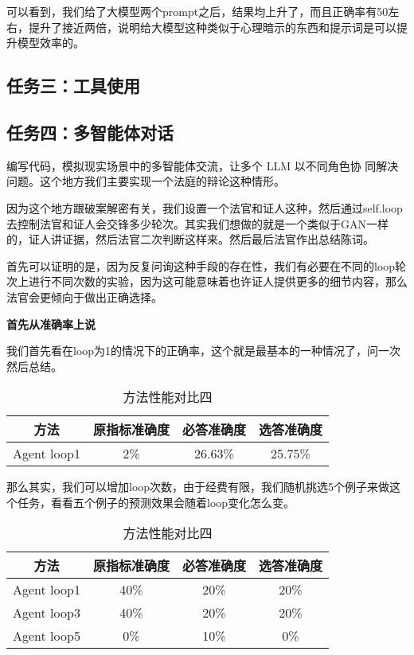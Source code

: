 \documentclass[answers]{exam}  %
\begin{document}
可以看到，我们给了大模型两个prompt之后，结果均上升了，而且正确率有50左右，提升了接近两倍，说明给大模型这种类似于心理暗示的东西和提示词是可以提升模型效率的。


\subsection{任务三：工具使用}

\subsection{任务四：多智能体对话}

编写代码，模拟现实场景中的多智能体交流，让多个 LLM 以不同角色协
同解决问题。这个地方我们主要实现一个法庭的辩论这种情形。

因为这个地方跟破案解密有关，我们设置一个法官和证人这种，然后通过self.loop去控制法官和证人会交锋多少轮次。其实我们想做的就是一个类似于GAN一样的，证人讲证据，然后法官二次判断这样来。然后最后法官作出总结陈词。

首先可以证明的是，因为反复问询这种手段的存在性，我们有必要在不同的loop轮次上进行不同次数的实验，因为这可能意味着也许证人提供更多的细节内容，那么法官会更倾向于做出正确选择。

\textbf{首先从准确率上说}

我们首先看在loop为1的情况下的正确率，这个就是最基本的一种情况了，问一次然后总结。

\begin{table}[h]
    \centering
    \begin{tabular}{cccc}
    \toprule
    \textbf{方法} & \textbf{原指标准确度} & \textbf{必答准确度} &\textbf{选答准确度}\\
    \midrule
    Agent loop1 & 2\% & 26.63\% & 25.75\% \\
    \bottomrule
    \end{tabular}
    \caption{方法性能对比四}
\end{table}

那么其实，我们可以增加loop次数，由于经费有限，我们随机挑选5个例子来做这个任务，看看五个例子的预测效果会随着loop变化怎么变。

\begin{table}[h]
    \centering
    \begin{tabular}{cccc}
    \toprule
    \textbf{方法} & \textbf{原指标准确度} & \textbf{必答准确度} &\textbf{选答准确度}\\
    \midrule
    Agent loop1 & 40\% & 20\% & 20\% \\
    \hline
    Agent loop3 & 40\% & 20\% & 20\% \\
    \hline
    Agent loop5 & 0\% & 10\% & 0\% \\
    \bottomrule
    \end{tabular}
    \caption{方法性能对比四}
\end{table}
\end{document}
